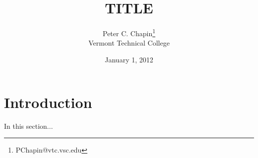 \documentclass{article}
\begin{document}
\title{TITLE}
\author{Peter C. Chapin\thanks{PChapin@vtc.vsc.edu}\\
  Vermont Technical College}
\date{January 1, 2012}
\maketitle


\section{Introduction}
\label{sec:introduction}

In this section...
\end{document}
